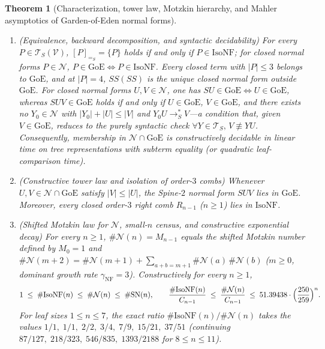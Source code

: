 \documentclass[11pt,reqno]{amsart}
\numberwithin{equation}{section}
\theoremstyle{plain}
\newtheorem{theorem}{Theorem}[section]
\theoremstyle{definition}
\theoremstyle{remark}
\newcommand{\TS}{\mathcal{T}_S}
\newcommand{\TSV}{\mathcal{T}_S(\mathcal{V})}
\newcommand{\NF}{\mathrm{NF}}
\newcommand{\SN}{\mathrm{SN}}
\newcommand{\redSs}{\to_S^*}
\newcommand{\convS}{=_S}
\begin{document}
\begin{theorem}[Characterization, tower law, Motzkin hierarchy, and Mahler asymptotics of Garden-of-Eden normal forms]
\label{thm:goe-characterization-and-mahler}
\begin{enumerate}[label=(\roman*),leftmargin=2.2em]
\item \emph{(Equivalence, backward decomposition, and syntactic decidability)} For every $P \in \TSV$, $[P]_{\convS} = \{P\}$ holds if and only if $P \in \mathrm{IsoNF}$; for closed normal forms $P \in \mathcal{N}$, $P \in \mathrm{GoE} \iff P \in \mathrm{IsoNF}$. Every closed term with $|P| \le 3$ belongs to $\mathrm{GoE}$, and at $|P| = 4$, $S S (S S)$ is the unique closed normal form outside $\mathrm{GoE}$. For closed normal forms $U, V \in \mathcal{N}$, one has $S U \in \mathrm{GoE} \iff U \in \mathrm{GoE}$, whereas $S U V \in \mathrm{GoE}$ holds if and only if $U \in \mathrm{GoE}$, $V \in \mathrm{GoE}$, and there exists no $Y_0 \in \mathcal{N}$ with $|Y_0| + |U| \le |V|$ and $Y_0 U \redSs V$---a condition that, given $V \in \mathrm{GoE}$, reduces to the purely syntactic check $\forall Y \in \TS,\, V \not\equiv Y U$. Consequently, membership in $\mathcal{N} \cap \mathrm{GoE}$ is constructively decidable in linear time on tree representations with subterm equality (or quadratic leaf-comparison time).
\item \emph{(Constructive tower law and isolation of order-$3$ combs)} Whenever $U, V \in \mathcal{N} \cap \mathrm{GoE}$ satisfy $|V| \le |U|$, the Spine-$2$ normal form $S U V$ lies in $\mathrm{GoE}$. Moreover, every closed order-$3$ right comb $R_{n-1}$ ($n \ge 1$) lies in $\mathrm{IsoNF}$.
\item \emph{(Shifted Motzkin law for $\mathcal{N}$, small-$n$ census, and constructive exponential decay)} For every $n \ge 1$, $\#\mathcal{N}(n) = M_{n-1}$ equals the shifted Motzkin number defined by $M_0 = 1$ and $\#\mathcal{N}(m+2) = \#\mathcal{N}(m+1) + \sum_{a+b=m+1} \#\mathcal{N}(a)\,\#\mathcal{N}(b)$ ($m \ge 0$, dominant growth rate $\gamma_{\NF} = 3$). Constructively for every $n \ge 1$,
\begin{equation}
\label{eq:iso-cnf-sn-hierarchy}
1 \;\le\; \#\mathrm{IsoNF}(n) \;\le\; \#\mathcal{N}(n) \;\le\; \#\SN(n),
\qquad
\frac{\#\mathrm{IsoNF}(n)}{C_{n-1}} \;\le\; \frac{\#\mathcal{N}(n)}{C_{n-1}} \;\le\; 51.39438 \cdot \Bigl(\frac{250}{259}\Bigr)^n.
\end{equation}
For leaf sizes $1 \le n \le 7$, the exact ratio $\#\mathrm{IsoNF}(n) / \#\mathcal{N}(n)$ takes the values $1/1,\; 1/1,\; 2/2,\; 3/4,\; 7/9,\; 15/21,\; 37/51$ (continuing $87/127,\; 218/323,\; 546/835,\; 1393/2188$ for $8 \le n \le 11$).

\end{enumerate}
\end{theorem}
\end{document}
